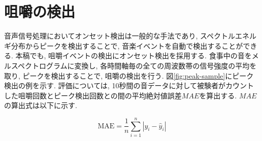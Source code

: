 \section{咀嚼の検出}

音声信号処理においてオンセット検出は一般的な手法であり, スペクトルエネルギ分布からピークを検出することで, 音楽イベントを自動で検出することができる. 本稿でも, 咀嚼イベントの検出にオンセット検出を採用する. 食事中の音をメルスペクトログラムに変換し, 各時間軸毎の全ての周波数帯の信号強度の平均を取り, ピークを検出することで, 咀嚼の検出を行う. 図\ref{fig:peak-sample}にピーク検出の例を示す. 評価については, 10秒間の音データに対して被験者がカウントした咀嚼回数とピーク検出回数との間の平均絶対値誤差$MAE$を算出する. $MAE$の算出式は以下に示す.

\begin{equation}
    \text{MAE} = \frac{1}{n} \sum_{i=1}^{n} | y_i - \hat{y}_i |
\end{equation}

